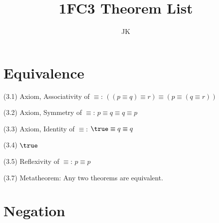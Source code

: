 \documentclass[a4paper,10pt]{article}
\title{1FC3 Theorem List}
\author{JK}
\newenvironment{theoremlist}{
\begin{description}
  \setlength{\itemsep}{1.5pt}
  \setlength{\parskip}{0pt}
  \setlength{\parsep}{0pt}
}{\end{description}}
\begin{document}
\maketitle
\thispagestyle{empty}

\newpage
\tableofcontents %
\thispagestyle{empty}

\cleardoublepage %

\setcounter{page}{1} %

\section{Equivalence}

\begin{theoremlist}
\item[(3.1) Axiom, Associativity of $\equiv$:] 					$ ((p \equiv q) \equiv r) \equiv (p \equiv (q \equiv r)) $
\item[(3.2) Axiom, Symmetry of $\equiv$:] 					$ p \equiv q \equiv q \equiv p $
\item[(3.3) Axiom, Identity of $\equiv$:] 					$ \true \equiv q \equiv q $
\item[(3.4)] 									$ \true $
\item[(3.5) Reflexivity of $ \equiv$:] 						$ p \equiv p $
\item[(3.7) Metatheorem:] 							Any two theorems are equivalent.
\end{theoremlist}


\section{Negation}
\end{document}
